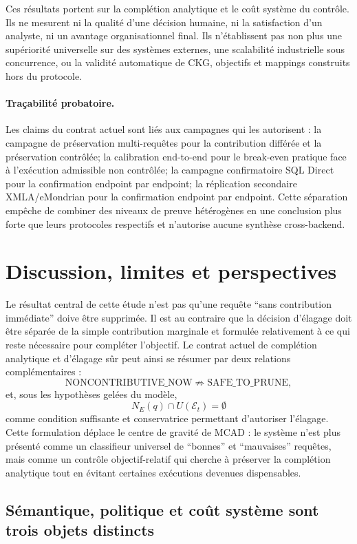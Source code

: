 \documentclass[journal]{IEEEtran}
\begin{document}
Ces résultats portent sur la complétion analytique et le coût système du contrôle. Ils ne mesurent ni la qualité d'une décision humaine, ni la satisfaction d'un analyste, ni un avantage organisationnel final. Ils n'établissent pas non plus une supériorité universelle sur des systèmes externes, une scalabilité industrielle sous concurrence, ou la validité automatique de CKG, objectifs et mappings construits hors du protocole.

\paragraph*{Traçabilité probatoire.} Les claims du contrat actuel sont liés aux campagnes qui les autorisent : la campagne de préservation multi-requêtes pour la contribution différée et la préservation contrôlée; la calibration end-to-end pour le break-even pratique face à l'exécution admissible non contrôlée; la campagne confirmatoire SQL Direct pour la confirmation endpoint par endpoint; la réplication secondaire XMLA/eMondrian pour la confirmation endpoint par endpoint. Cette séparation empêche de combiner des niveaux de preuve hétérogènes en une conclusion plus forte que leurs protocoles respectifs et n'autorise aucune synthèse cross-backend.


\section{Discussion, limites et perspectives}
\label{sec:discussion}

Le résultat central de cette étude n'est pas qu'une requête ``sans contribution immédiate'' doive être supprimée. Il est au contraire que la décision d'élagage doit être séparée de la simple contribution marginale et formulée relativement à ce qui reste nécessaire pour compléter l'objectif. Le contrat actuel de complétion analytique et d'élagage sûr peut ainsi se résumer par deux relations complémentaires :
\[
\text{NONCONTRIBUTIVE\_NOW}\not\Rightarrow\text{SAFE\_TO\_PRUNE},
\]
et, sous les hypothèses gelées du modèle,
\[
N_E(q)\cap U(\mathcal{E}_t)=\emptyset
\]
comme condition suffisante et conservatrice permettant d'autoriser l'élagage. Cette formulation déplace le centre de gravité de MCAD : le système n'est plus présenté comme un classifieur universel de ``bonnes'' et ``mauvaises'' requêtes, mais comme un contrôle objectif-relatif qui cherche à préserver la complétion analytique tout en évitant certaines exécutions devenues dispensables.

\subsection{Sémantique, politique et coût système sont trois objets distincts}
\end{document}
